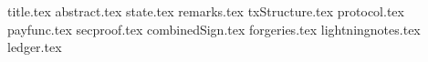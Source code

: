\documentclass[11pt]{llncs}
\begin{document}
\pagestyle{plain}
{title.tex}
{abstract.tex}
{state.tex}
{remarks.tex}
{txStructure.tex}
{protocol.tex}
{payfunc.tex}
{secproof.tex}
{combinedSign.tex}
{forgeries.tex}
{lightningnotes.tex}
{ledger.tex}


\end{document}

